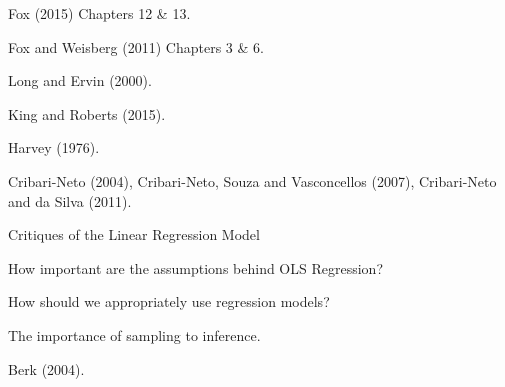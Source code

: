 \documentclass[letterpaper]{article}
\renewenvironment{itemize}{
  \begin{list}{}{
    \setlength{\leftmargin}{1.5em}
  }
}{
  \end{list}
}
\begin{document}
\begin{enumerate}
			\begin{itemize}
				\item[$\star$] Fox (2015) Chapters 12 \& 13.
				\item[$\star$] Fox and Weisberg (2011) Chapters 3 \& 6.
				\item[$\star$] Long and Ervin (2000).
				\item[$\star$] King and Roberts (2015).
				\item[-] Harvey (1976).
				\item[-] Cribari-Neto (2004), Cribari-Neto, Souza and Vasconcellos (2007), Cribari-Neto and da Silva (2011).
			\end{itemize}



	\item Critiques of the Linear Regression Model

			\begin{itemize}
				\item[$\square$] How important are the assumptions behind OLS Regression? 
				\item[$\square$] How should we appropriately use regression models?
				\item[$\square$] The importance of sampling to inference.
			\end{itemize}



			\begin{itemize}
				\item[$\star$] Berk (2004).
			\end{itemize}


\end{enumerate}


\newpage
\end{document}
